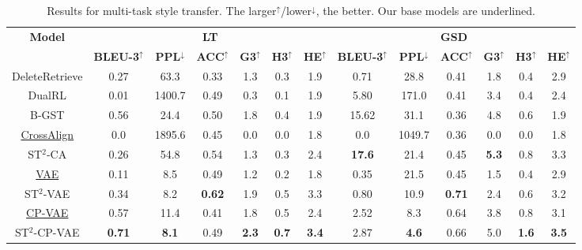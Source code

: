\begin{table*}[th]
	\footnotesize
	\centering
	\begin{tabular}{c|cccccc|cccccc}
		\hline
		\multirow{2}{*}{\textbf{Model}} & \multicolumn{6}{c|}{\textbf{LT}} & \multicolumn{6}{c}{\textbf{GSD}} \\
		\cline{2-13}
		& \textbf{BLEU-3}$^{\uparrow}$  & \textbf{PPL}$^\downarrow$ & \textbf{ACC}$^\uparrow$ &\textbf{G3}$^\uparrow$ &\textbf{H3}$^\uparrow$ & \textbf{HE}$^\uparrow$ & \textbf{BLEU-3}$^\uparrow$ & \textbf{PPL}$^\downarrow$ & \textbf{ACC}$^\uparrow$ &\textbf{G3}$^\uparrow$ &\textbf{H3}$^\uparrow$& \textbf{HE}$^\uparrow$ \\
		\hline

		DeleteRetrieve & 0.27 & 63.3 & 0.33 &1.3 &0.3 & 1.9 & 0.71  & 28.8 & 0.41 &1.8 &0.4 & 2.9 \\
		DualRL & 0.01 & 1400.7 & 0.49 &0.3 &0.1 & 1.9 & 5.80  & 171.0 & 0.41 &3.4 &0.4 & 2.4 \\

		B-GST & 0.56 & 24.4 &0.50  &1.8 &0.4 & 1.9  & 15.62  & 31.1 &0.36  &4.8 &0.6 & 1.9  \\

		\hline
		\underline{CrossAlign} & 0.0  & 1895.6 & 0.45 &0.0 &0.0 & 1.8 & 0.0  & 1049.7 & 0.36 &0.0 &0.0 & 1.8 \\
		ST$^2$-CA & 0.26 & 54.8 & 0.54 &1.3 &0.3 & 2.4 & \textbf{17.6} & 21.4 & 0.45 &\textbf{5.3} &0.8 & 3.3 
		\\
		\hline
		\underline{VAE} & 0.11  & 8.5 & 0.49 &1.2 &0.2 & 1.8 & 0.35 & 21.5 & 0.45 &1.5 &0.4 & 2.9 \\
		ST$^2$-VAE & 0.34  & 8.2 & \textbf{0.62} &1.9 &0.5 & 3.3 & 0.80 & 10.9 & \textbf{0.71} &2.4 &0.6 & 3.2 \\
		\hline
		\underline{CP-VAE} & 0.57 & 11.4 &0.41  &1.8 &0.5 & 2.4  & 2.52  & 8.3 &0.64  &3.8 &0.8 &3.1  \\
		ST$^2$-CP-VAE &\textbf{0.71}   &\textbf{8.1}  &0.49  &\textbf{2.3}  &\textbf{0.7} &\textbf{3.4}  &2.87  &\textbf{4.6}  &0.66  &5.0 &\textbf{1.6} &\textbf{3.5}  \\
		\hline
	\end{tabular}
	\caption{Results for multi-task style transfer. The larger$^\uparrow$/lower$^\downarrow$, the better. Our base models are underlined.}\label{tb:exp1}
\end{table*}

